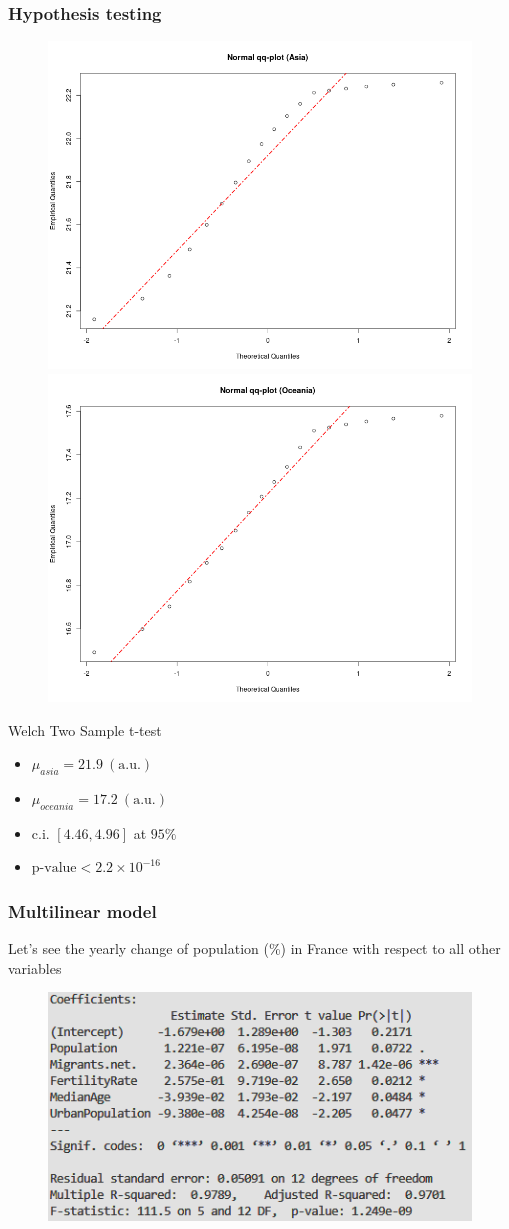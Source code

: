\documentclass[
	11pt, %
]{beamer}
\begin{document}
\begin{frame}
	\frametitle{Hypothesis testing}
	\begin{figure}
		\includegraphics[width=.45\textwidth]{qqnorm_asia.png}
		\includegraphics[width=.45\textwidth]{qqnorm_oceania.png}
	\end{figure}
	\begin{exampleblock}{Welch Two Sample t-test}
		\begin{itemize}
			\item $\mu_{asia} = 21.9 \ \left(\text{a.u.}\right)$
			\item $\mu_{oceania} = 17.2 \ \left(\text{a.u.}\right)$
			\item c.i. $\left[4.46, 4.96\right]$ at $95\%$
			\item $\text{p-value} < 2.2 \times 10^{-16}$
		\end{itemize}
	\end{exampleblock}
\end{frame}

\begin{frame}
	\frametitle{Multilinear model}
	Let's see the yearly change of population (\%) in France with respect to all other variables
	\begin{figure}
		\includegraphics[width=.75\textwidth]{france.png}
	\end{figure}
\end{frame}
\end{document}
